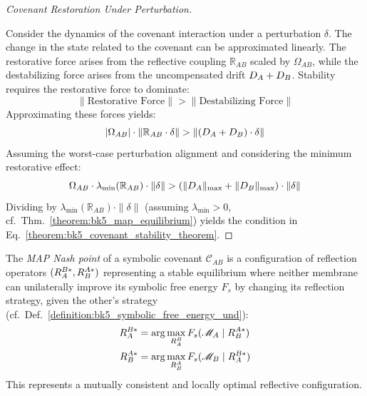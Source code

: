 \begin{proof}[Covenant Restoration Under Perturbation]
\label{proof:bk5_covenant_perturbation_restoration}
\leavevmode

Consider the dynamics of the covenant interaction under a perturbation $\delta$. The change in the state related to the covenant can be approximated linearly. The restorative force arises from the reflective coupling $\mathbb{R}_{AB}$ scaled by $\Omega_{AB}$, while the destabilizing force arises from the uncompensated drift $D_A + D_B$. Stability requires the restorative force to dominate:
\begin{equation}
\|\text{Restorative Force}\| > \|\text{Destabilizing Force}\|
\end{equation}
Approximating these forces yields:
\begin{equation}
|\Omega_{AB}| \cdot \|\mathbb{R}_{AB} \cdot \delta\| > \|(D_A + D_B) \cdot \delta\|
\end{equation}
Assuming the worst-case perturbation alignment and considering the minimum restorative effect:
\begin{equation}
\Omega_{AB} \cdot \lambda_{\min}(\mathbb{R}_{AB}) \cdot \|\delta\| > (\|D_A\|_{\max} + \|D_B\|_{\max}) \cdot \|\delta\|
\end{equation}
Dividing by $\lambda_{\min}(\mathbb{R}_{AB}) \cdot \|\delta\|$ (assuming $\lambda_{\min} > 0$, cf.~Thm.~\ref{theorem:bk5_map_equilibrium}) yields the condition in Eq.~\eqref{theorem:bk5_covenant_stability_theorem}.
\end{proof}
\begin{definition}
\label{definition:bk5_map_nash_point}
The \emph{MAP Nash point} of a symbolic covenant $\mathcal{C}_{AB}$ is a configuration of reflection operators $(R_A^{B*}, R_B^{A*})$ representing a stable equilibrium where neither membrane can unilaterally improve its symbolic free energy $F_s$ by changing its reflection strategy, given the other's strategy (cf.~Def.~\ref{definition:bk5_symbolic_free_energy_und}):
\begin{align}
    R_{A}^{B*} &= \arg\max_{R_{A}^B} F_s(\mathscr{M}_A \mid R_{B}^{A*}) \\
    R_{B}^{A*} &= \arg\max_{R_{B}^A} F_s(\mathscr{M}_B \mid R_{A}^{B*}) 
\end{align}
This represents a mutually consistent and locally optimal reflective configuration.
\end{definition}


